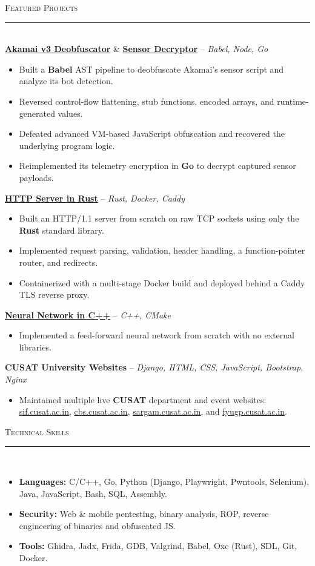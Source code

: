 \documentclass[a4paper,11pt]{article}
\newcommand{\header}[1]{\vfill{\large\textsc{#1}}\\[-8pt]\rule{\linewidth}{0.4pt}\\[2pt]}
\begin{document}
\header{Featured Projects}
\href{https://github.com/answarck/akamai-v3-deobfuscator}{\textbf{Akamai v3 Deobfuscator}} \& \href{https://github.com/answarck/akamai-v3-sensor-decryptor}{\textbf{Sensor Decryptor}} -- {\sl Babel, Node, Go}
\begin{itemize}
    \item Built a \textbf{Babel} AST pipeline to deobfuscate Akamai's sensor script and analyze its bot detection.
    \item Reversed control-flow flattening, stub functions, encoded arrays, and runtime-generated values.
    \item Defeated advanced VM-based JavaScript obfuscation and recovered the underlying program logic.
    \item Reimplemented its telemetry encryption in \textbf{Go} to decrypt captured sensor payloads.
\end{itemize}
\vspace{3pt}
\href{https://github.com/answarck/http-server-rust}{\textbf{HTTP Server in Rust}} -- {\sl Rust, Docker, Caddy}
\begin{itemize}
    \item Built an HTTP/1.1 server from scratch on raw TCP sockets using only the \textbf{Rust} standard library.
    \item Implemented request parsing, validation, header handling, a function-pointer router, and redirects.
    \item Containerized with a multi-stage Docker build and deployed behind a Caddy TLS reverse proxy.
\end{itemize}
\vspace{3pt}
\href{https://github.com/answarck/NeuralNetwork_from_scratch_cpp}{\textbf{Neural Network in C++}} -- {\sl C++, CMake}
\begin{itemize}
    \item Implemented a feed-forward neural network from scratch with no external libraries.
\end{itemize}
\vspace{3pt}
\textbf{CUSAT University Websites} -- {\sl Django, HTML, CSS, JavaScript, Bootstrap, Nginx}
\begin{itemize}
    \item Maintained multiple live \textbf{CUSAT} department and event websites: \href{https://sif.cusat.ac.in}{sif.cusat.ac.in}, \href{https://cbs.cusat.ac.in}{cbs.cusat.ac.in}, \href{https://sargam.cusat.ac.in}{sargam.cusat.ac.in}, and \href{https://fyugp.cusat.ac.in}{fyugp.cusat.ac.in}.
\end{itemize}

\header{Technical Skills}
\begin{itemize}
    \item \textbf{Languages:} C/C++, Go, Python (Django, Playwright, Pwntools, Selenium), Java, JavaScript, Bash, SQL, Assembly.
    \item \textbf{Security:} Web \& mobile pentesting, binary analysis, ROP, reverse engineering of binaries and obfuscated JS.
    \item \textbf{Tools:} Ghidra, Jadx, Frida, GDB, Valgrind, Babel, Oxc (Rust), SDL, Git, Docker.
\end{itemize}
\vfill
\end{document}
